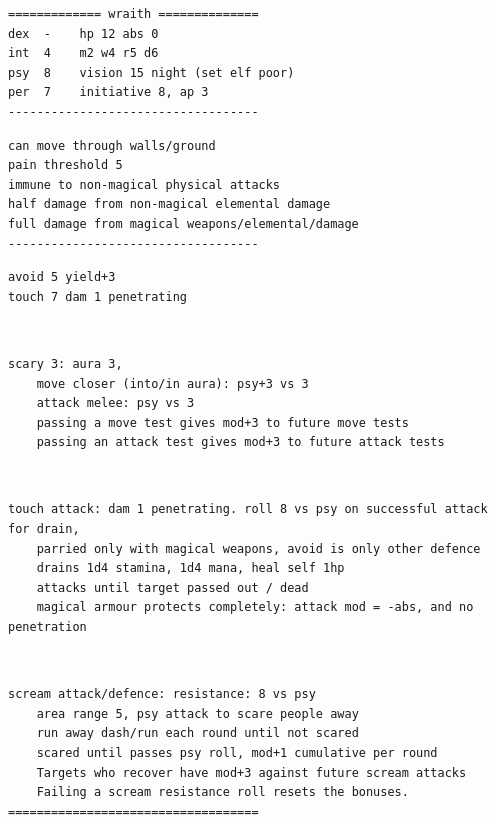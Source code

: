 \small \begin{samepage} \begin{verbatim}
============= wraith ==============
dex  -    hp 12 abs 0
int  4    m2 w4 r5 d6
psy  8    vision 15 night (set elf poor)
per  7    initiative 8, ap 3
-----------------------------------
\end{verbatim} \goodbreak \begin{verbatim}
can move through walls/ground
pain threshold 5
immune to non-magical physical attacks
half damage from non-magical elemental damage
full damage from magical weapons/elemental/damage
-----------------------------------
\end{verbatim} \goodbreak \begin{verbatim}
avoid 5 yield+3
touch 7 dam 1 penetrating
\end{verbatim} \end{samepage}   \   \goodbreak \begin{samepage} \begin{verbatim}
scary 3: aura 3,
    move closer (into/in aura): psy+3 vs 3
    attack melee: psy vs 3
    passing a move test gives mod+3 to future move tests
    passing an attack test gives mod+3 to future attack tests
\end{verbatim} \end{samepage}   \   \goodbreak \begin{samepage} \begin{verbatim}
touch attack: dam 1 penetrating. roll 8 vs psy on successful attack for drain,
    parried only with magical weapons, avoid is only other defence
    drains 1d4 stamina, 1d4 mana, heal self 1hp
    attacks until target passed out / dead
    magical armour protects completely: attack mod = -abs, and no penetration
\end{verbatim} \end{samepage}   \   \goodbreak \begin{samepage} \begin{verbatim}
scream attack/defence: resistance: 8 vs psy
    area range 5, psy attack to scare people away
    run away dash/run each round until not scared
    scared until passes psy roll, mod+1 cumulative per round
    Targets who recover have mod+3 against future scream attacks
    Failing a scream resistance roll resets the bonuses.
===================================
\end{verbatim} \end{samepage} \normalsize
























